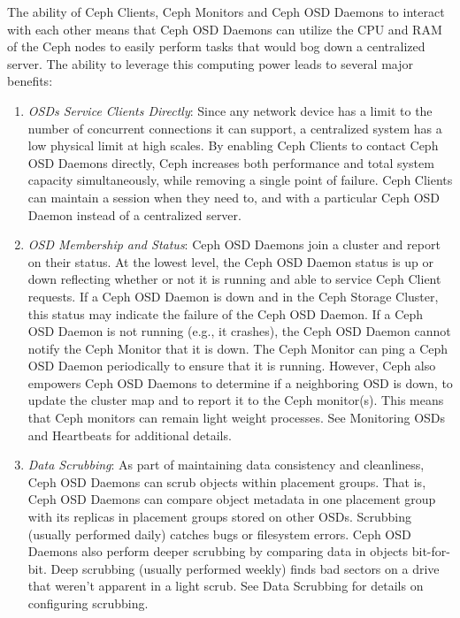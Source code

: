 \documentclass[12pt,a4paper]{report}
\begin{document}
The ability of Ceph Clients, Ceph Monitors and Ceph OSD Daemons to interact
with each other means that Ceph OSD Daemons can utilize the CPU and RAM of the
Ceph nodes to easily perform tasks that would bog down a centralized server.
The ability to leverage this computing power leads to several major benefits:

\begin{enumerate}
	\item \emph{OSDs Service Clients Directly}: Since any network device
		has a limit to the number of concurrent connections it can
		support, a centralized system has a low physical limit at high
		scales. By enabling Ceph Clients to contact Ceph OSD Daemons
		directly, Ceph increases both performance and total system
		capacity simultaneously, while removing a single point of
		failure. Ceph Clients can maintain a session when they need to,
		and with a particular Ceph OSD Daemon instead of a centralized
		server.

	\item \emph{OSD Membership and Status}: Ceph OSD Daemons join a cluster and
		report on their status. At the lowest level, the Ceph OSD Daemon status
		is up or down reflecting whether or not it is running and able to
		service Ceph Client requests. If a Ceph OSD Daemon is down and in the
		Ceph Storage Cluster, this status may indicate the failure of the Ceph
		OSD Daemon. If a Ceph OSD Daemon is not running (e.g., it crashes), the
		Ceph OSD Daemon cannot notify the Ceph Monitor that it is down. The
		Ceph Monitor can ping a Ceph OSD Daemon periodically to ensure that it
		is running. However, Ceph also empowers Ceph OSD Daemons to determine
		if a neighboring OSD is down, to update the cluster map and to report
		it to the Ceph monitor(s). This means that Ceph monitors can remain
		light weight processes. See Monitoring OSDs and Heartbeats for
		additional details.

	\item \emph{Data Scrubbing}: As part of maintaining data consistency
		and cleanliness, Ceph OSD Daemons can scrub objects within
		placement groups. That is, Ceph OSD Daemons can compare object
		metadata in one placement group with its replicas in placement
		groups stored on other OSDs. Scrubbing (usually performed
		daily) catches bugs or filesystem errors. Ceph OSD Daemons also
		perform deeper scrubbing by comparing data in objects
		bit-for-bit. Deep scrubbing (usually performed weekly) finds
		bad sectors on a drive that weren’t apparent in a light scrub.
		See Data Scrubbing for details on configuring scrubbing.


\end{enumerate}
\end{document}
